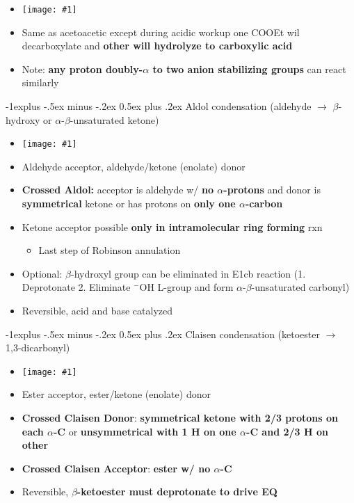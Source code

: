 \documentclass[10pt,landscape]{article}
\makeatletter
\renewcommand{\subsection}{\@startsection{subsection}{2}{0mm}%
  {-1explus -.5ex minus -.2ex}%
  {0.5ex plus .2ex}%
  {\normalfont\normalsize\bfseries}}
\newcommand{\img}[1]{\texttt{[image: \#1]}}
\makeatother
\begin{document}
\begin{multicols*}{3}
\begin{scriptsize}
    \begin{itemize}
    \item[] \img{malon1.png}
    \item Same as acetoacetic except during acidic workup one COOEt wil decarboxylate and
      \textbf{other will hydrolyze to carboxylic acid}
    \item Note: \textbf{any proton doubly-$\alpha$ to two anion stabilizing groups} can react similarly
    \end{itemize}

    \subsection{Aldol condensation (aldehyde $\rightarrow$ $\beta$-hydroxy or
      $\alpha$-$\beta$-unsaturated ketone)}

    \begin{itemize}
    \item[] \img{aldol.png}
    \item Aldehyde acceptor, aldehyde/ketone (enolate) donor
    \item \textbf{Crossed Aldol:} acceptor is aldehyde w/ \textbf{no $\alpha$-protons}
      and donor is \textbf{symmetrical} ketone or has protons on \textbf{only one
        $\alpha$-carbon} 
    \item Ketone acceptor possible \textbf{only in intramolecular ring forming} rxn
      \begin{itemize}
      \item Last step of Robinson annulation
      \end{itemize}
    \item Optional: $\beta$-hydroxyl group can be eliminated in E1cb reaction
      (1. Deprotonate 2. Eliminate $^-$OH L-group and form $\alpha$-$\beta$-unsaturated carbonyl)
    \item Reversible, acid and base catalyzed
    \end{itemize}

    \subsection{Claisen condensation (ketoester $\rightarrow$ 1,3-dicarbonyl)}

    \begin{itemize}
    \item[] \img{claisen.png}
    \item Ester acceptor, ester/ketone (enolate) donor
    \item \textbf{Crossed Claisen Donor}: \textbf{symmetrical ketone with 2/3
        protons on each $\alpha$-C} or \textbf{unsymmetrical with 1 H on one $\alpha$-C
        and 2/3 H on other} 
    \item \textbf{Crossed Claisen Acceptor}: \textbf{ester w/ no $\alpha$-C}
    \item Reversible, \textbf{$\beta$-ketoester must deprotonate to drive EQ}
    \end{itemize}


\end{scriptsize}
\end{multicols*}
\end{document}
